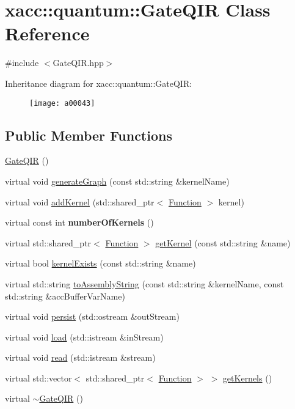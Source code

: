 \hypertarget{a00043}{}\section{xacc\+:\+:quantum\+:\+:Gate\+Q\+IR Class Reference}
\label{a00043}


{\ttfamily \#include $<$Gate\+Q\+I\+R.\+hpp$>$}

Inheritance diagram for xacc\+:\+:quantum\+:\+:Gate\+Q\+IR\+:\begin{figure}[H]
\begin{center}
\leavevmode
\texttt{[image: a00043]}
\end{center}
\end{figure}
\subsection*{Public Member Functions}
\begin{DoxyCompactItemize}
\item 
\hyperlink{a00043_afb99f610a6b123538c659169c131a634}{Gate\+Q\+IR} ()
\item 
virtual void \hyperlink{a00043_ad1ddd6105346dd9fc78648fd812285ed}{generate\+Graph} (const std\+::string \&kernel\+Name)
\item 
virtual void \hyperlink{a00043_aa6ed2cf2cbcfec8105c327a4fa95346f}{add\+Kernel} (std\+::shared\+\_\+ptr$<$ \hyperlink{a00039}{Function} $>$ kernel)
\item 
virtual const int {\bfseries number\+Of\+Kernels} ()\hypertarget{a00043_aca6be85526b14f500e7f98954dd6da5c}{}\label{a00043_aca6be85526b14f500e7f98954dd6da5c}

\item 
virtual std\+::shared\+\_\+ptr$<$ \hyperlink{a00039}{Function} $>$ \hyperlink{a00043_a194758b6edcc3ae0c7fe8004f9bfe690}{get\+Kernel} (const std\+::string \&name)
\item 
virtual bool \hyperlink{a00043_a692f95099caa7c024110a3f035941dca}{kernel\+Exists} (const std\+::string \&name)
\item 
virtual std\+::string \hyperlink{a00043_a7153f7e9f516d43af3d5d4f95d60bd86}{to\+Assembly\+String} (const std\+::string \&kernel\+Name, const std\+::string \&acc\+Buffer\+Var\+Name)
\item 
virtual void \hyperlink{a00043_a40e1d07e4dfd3794ef53fca3cdbdca61}{persist} (std\+::ostream \&out\+Stream)
\item 
virtual void \hyperlink{a00043_a07f26eeb362ac480d20da6cdc8c8fb39}{load} (std\+::istream \&in\+Stream)
\item 
virtual void \hyperlink{a00043_a26019e2f1e13e64645e29aee86ac58b1}{read} (std\+::istream \&stream)
\item 
virtual std\+::vector$<$ std\+::shared\+\_\+ptr$<$ \hyperlink{a00039}{Function} $>$ $>$ \hyperlink{a00043_a4ace7ee5ebef84b1f39aaf5ed12c6cc6}{get\+Kernels} ()
\item 
virtual \hyperlink{a00043_ac88db03f1dd29e2d36aaa6c01a130008}{$\sim$\+Gate\+Q\+IR} ()
\end{DoxyCompactItemize}
